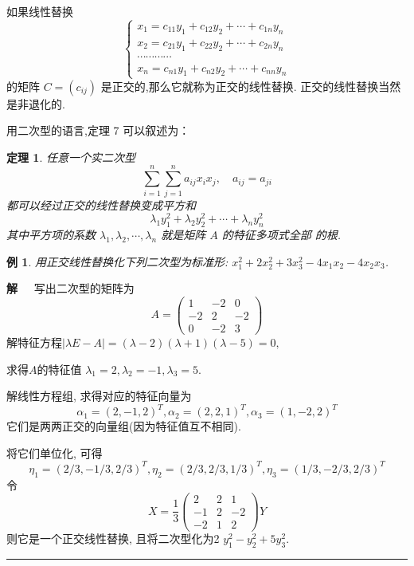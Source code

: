 \documentclass[13pt]{beamer}
\newtheorem{thm}{定理}
\newtheorem{exa}{例}
\def\qed{\nopagebreak\hfill{\rule{4pt}{7pt}}\medbreak}
\def\sol{{\bf 解~~ }}
\begin{document}
\begin{frame}
\small{如果线性替换
\[
\left\{\begin{array}{l}
x_{1}=c_{11} y_{1}+c_{12} y_{2}+\cdots+c_{1 n} y_{n} \\
x_{2}=c_{21} y_{1}+c_{22} y_{2}+\cdots+c_{2 n} y_{n} \\
\cdots \cdots \cdots \cdots \\
x_{n}=c_{n 1} y_{1}+c_{n 2} y_{2}+\cdots+c_{n n} y_{n}
\end{array}\right.
\]
的矩阵 ${C}=\left(c_{i j}\right)$ 是正交的,那么它就称为正交的线性替换.
正交的线性替换当然是非退化的. 

用二次型的语言,定理 7 可以叙述为： 
\begin{thm}
任意一个实二次型
\[
\sum_{i=1}^{n} \sum_{j=1}^{n} a_{i j} x_{i} x_{j},  \quad  a_{i j}=a_{j i}
\]
都可以经过正交的线性替换变成平方和
\[
\lambda_{1} y_{1}^{2}+\lambda_{2} y_{2}^{2}+\cdots+\lambda_{n} y_{n}^{2}
\]
其中平方项的系数 $\lambda_{1}, \lambda_{2}, \cdots, \lambda_{n}$ 就是矩阵 ${A}$ 的特征多项式全部 的根. 
\end{thm}
}
\end{frame}

\begin{frame}
\begin{exa}
用正交线性替换化下列二次型为标准形:
$ x_{1}^{2}+2 x_{2}^{2}+3 x_{3}^{2}-4 x_{1} x_{2}-4 x_{2} x_{3}$.
\end{exa}

\sol 写出二次型的矩阵为
\[
A=\left(\begin{array}{ccc}
1 & -2 & 0 \\
-2 & 2 & -2 \\
0 & -2 & 3
\end{array}\right)
\]
解特征方程$|\lambda E - A |=(\lambda-2)(\lambda+1)(\lambda-5)=0,$ 

求得$A$的特征值 $\lambda_{1}=2, \lambda_{2}=-1, \lambda_{3}=5 .$ 

解线性方程组, 求得对应的特征向量为
\[
\alpha_{1}=(2,-1,2)^{T}, \alpha_{2}=(2,2,1)^{T}, \alpha_{3}=(1,-2,2)^{T}
\]
它们是两两正交的向量组(因为特征值互不相同). 
\end{frame}

\begin{frame}
将它们单位化, 可得
\[
\eta_{1}=(2 / 3,-1 / 3,2 / 3)^{T}, \eta_{2}=(2 / 3,2 / 3,1 / 3)^{T}, \eta_{3}=(1 / 3,-2 / 3,2 / 3)^{T}
\]
令
\[
X=\frac{1}{3}\left(\begin{array}{ccc}
2 & 2 & 1 \\
-1 & 2 & -2 \\
-2 & 1 & 2
\end{array}\right) Y
\]
则它是一个正交线性替换, 且将二次型化为2 $y_{1}^{2}-y_{2}^{2}+5 y_{3}^{2}$.
\qed
\end{frame}
\end{document}
